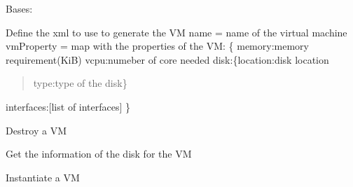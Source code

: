 \documentclass[letterpaper,10pt,oneside]{sphinxmanual}
\begin{document}
\begin{fulllineitems}
\label{libvirtManager:libvirtManager.ComputeManager}
Bases: 

\begin{fulllineitems}
\label{libvirtManager:libvirtManager.ComputeManager.defineXML}
Define the xml to use to generate the VM
name = name of the virtual machine
vmProperty = map with the properties of the VM:
\{
memory:memory requirement(KiB)
vcpu:numeber of core needed
disk:\{location:disk location
\begin{quote}

type:type of the disk\}
\end{quote}

interfaces:{[}list of interfaces{]}
\}

\end{fulllineitems}


\begin{fulllineitems}
\label{libvirtManager:libvirtManager.ComputeManager.deleteNF}
Destroy a VM

\end{fulllineitems}


\begin{fulllineitems}
\label{libvirtManager:libvirtManager.ComputeManager.getDiskInfo}
Get the information of the disk for the VM

\end{fulllineitems}


\begin{fulllineitems}
\label{libvirtManager:libvirtManager.ComputeManager.instantiateNF}
Instantiate a VM

\end{fulllineitems}


\end{fulllineitems}
\end{document}
